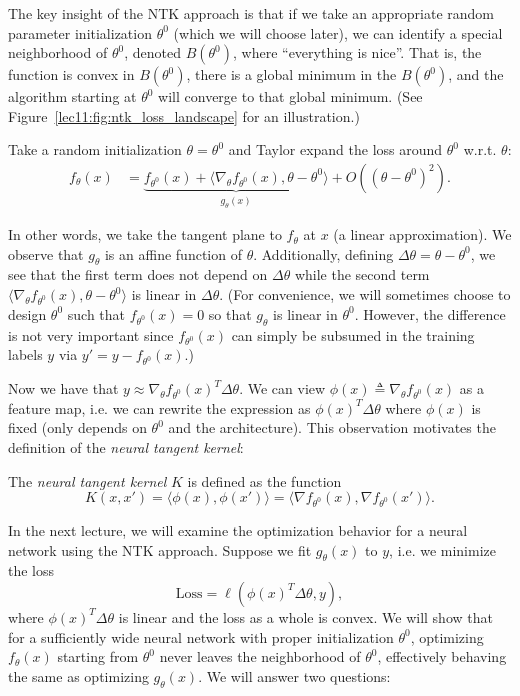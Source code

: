 The key insight of the NTK approach is that if we take an appropriate random parameter initialization $\theta^0$ (which we will choose later), we can identify a special neighborhood of $\theta^0$, denoted $B(\theta^0)$, where ``everything is nice''. That is, the function is convex in $B(\theta^0)$, there is a global minimum in the $B(\theta^0)$, and the algorithm starting at $\theta^0$ will converge to that global minimum. (See Figure~\ref{lec11:fig:ntk_loss_landscape} for an illustration.)


Take a random initialization $\theta = \theta^0$ and Taylor expand the loss around $\theta^0$ w.r.t. $\theta$:
\begin{align}
f_\theta(x) &= \underbrace{f_{\theta^0}(x) + \langle \nabla_\theta f_{\theta^0}(x), \theta - \theta^0 \rangle}_{g_\theta(x)} + O((\theta-\theta^0)^2).
\end{align}

In other words, we take the tangent plane to $f_\theta$ at $x$ (a linear approximation). We observe that $g_\theta$ is an affine function of $\theta$. Additionally, defining $\Delta \theta = \theta - \theta^0$, we see that the first term does not depend on $\Delta \theta$ while the second term $\langle \nabla_\theta f_{\theta^0}(x), \theta - \theta^0 \rangle$ is linear in $\Delta \theta$. (For convenience, we will sometimes choose to design $\theta^0$ such that $f_{\theta^0}(x) = 0$ so that $g_\theta$ is linear in $\theta^0$. However, the difference is not very important since $f_{\theta^0}(x)$ can simply be subsumed in the training labels $y$ via $y' = y - f_{\theta^0}(x)$.)

Now we have that $y \approx \nabla_\theta f_{\theta^0}(x)^T \Delta \theta$. We can view $\phi(x) \triangleq \nabla_\theta f_{\theta^0}(x)$ as a feature map, i.e. we can rewrite the expression as $\phi(x)^T \Delta \theta$ where $\phi(x)$ is fixed (only depends on $\theta^0$ and the architecture). This observation motivates the definition of the \textit{neural tangent kernel}:

\begin{definition}
The \emph{neural tangent kernel} $K$ is defined as the function
\begin{equation}
K(x, x') = \langle \phi(x), \phi(x')\rangle = \langle \nabla f_{\theta^0}(x), \nabla f_{\theta^0}(x') \rangle.
\end{equation}
\end{definition}

In the next lecture, we will examine the optimization behavior for a neural network using the NTK approach.  Suppose we fit $g_\theta(x)$ to $y$, i.e. we minimize the loss 
\begin{equation}
\textrm{Loss} = \ell(\phi(x)^T \Delta \theta, y),
\end{equation}
where $\phi(x)^T\Delta \theta$ is linear and the loss as a whole is convex.
We will show that for a sufficiently wide neural network with proper initialization $\theta^0$, optimizing $f_\theta(x)$ starting from $\theta^0$ never leaves the neighborhood of $\theta^0$, effectively behaving the same as optimizing $g_\theta(x)$. We will answer two questions:

